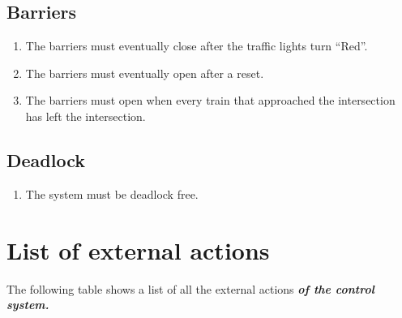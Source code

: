 \documentclass[10pt,a4paper]{article}
\begin{document}
\subsection{Barriers}
\begin{enumerate}[resume]
\item The barriers must eventually close after the traffic lights turn ``Red''.
\item The barriers must eventually open after a reset.
\item The barriers must open when every train that approached the intersection has left the intersection.
\end{enumerate}

\subsection{Deadlock}
\begin{enumerate}[resume]
\item The system must be deadlock free.
\end{enumerate}


\newpage
\section{List of external actions}

The following table shows a list of all the external actions \textbf{\textit{of the control system.}}\\
\end{document}
